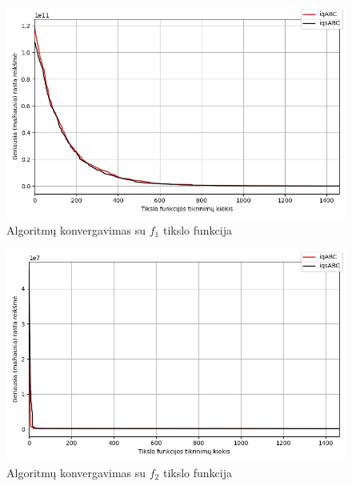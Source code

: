 \documentclass{VUMIFPSmagistrinis}
\begin{document}
\begin{landscape}
\begin{multicols}{2}
\begin{figure}[H]
    \centering
    \includegraphics[scale=0.5]{img/2kg/f1.jpg}
    \caption{Algoritmų konvergavimas su $f_{1}$ tikslo funkcija}
    \label{img:vkonf1}
\end{figure}

\begin{figure}[H]
    \centering
    \includegraphics[scale=0.5]{img/2kg/f2.jpg}
    \caption{Algoritmų konvergavimas su $f_{2}$ tikslo funkcija}
    \label{img:vkonf2}
\end{figure}




\end{multicols}\newpage
\begin{multicols}{2}



\end{multicols}
\end{landscape}
\end{document}
